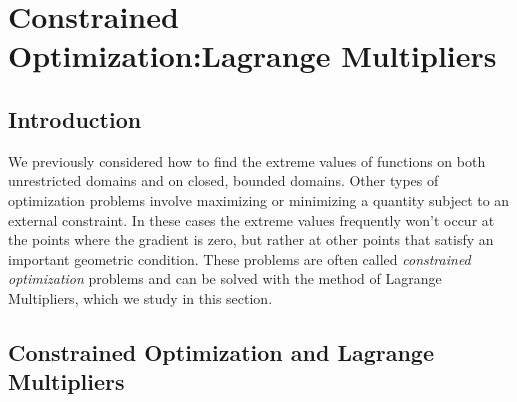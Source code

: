 \section{Constrained Optimization:Lagrange Multipliers} \label{S:10.8.Lagrange_Multipliers}

\vspace*{-14 pt}

\subsection*{Introduction}

We previously considered how to find the extreme values of functions on both unrestricted domains and on closed, bounded domains. Other types of optimization problems involve maximizing or minimizing a quantity subject to an external constraint. In these cases the extreme values frequently won't occur at the points where the gradient is zero, but rather at other points that satisfy an important geometric condition. These problems are often called \emph{constrained optimization} problems and can be solved with the method of Lagrange Multipliers, which we study in this section. 



\subsection*{Constrained Optimization and Lagrange Multipliers}

